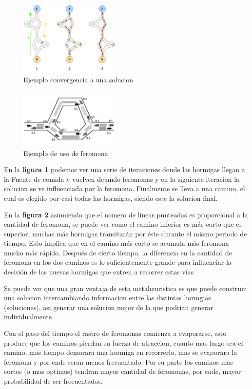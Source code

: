 \begin{figure}[h]
\centering
\caption{Ejemplo convergencia a una solucion}
\includegraphics[width=5cm]{imagenes/feromona}
\end{figure}

\begin{figure}[h]
\caption{Ejemplo de uso de feromona}
\centering
\includegraphics[width=5cm]{imagenes/feromona2}
\end{figure}

En la \textbf{figura 1} podemos ver una serie de iteraciones donde las hormigas llegan a la Fuente de comida y vuelven dejando feromonas y en la siguiente iteracion la solucion se ve influenciada por la feromona. Finalmente se lleva a una camino, el cual es elegido por casi todas las hormigas, siendo este la solucion final.

En la \textbf{figura 2} asumiendo que el nomero de lineas punteadas es proporcional a la cantidad de feromona, se puede ver como el camino inferior es más corto que el superior, muchas más hormigas transitarán por éste durante el mismo periodo de tiempo. Esto implica que en el camino más corto se acumula más feromona mucho más rápido. Después de cierto tiempo, la diferencia en la cantidad de feromona en los dos caminos es lo suficientemente grande para influenciar la decisión de las nuevas hormigas que entren a recorrer estas vías

Se puede ver que una gran ventaja de esta metaheuristica es que puede construir una solucion intercambiando informacion entre las distintas hormgias (soluciones), asi generar una solucion mejor de la que podrian generar individualmente.

Con el paso del tiempo el rastro de feromonas comienza a evaporarse, esto produce que los caminos pierdan su fuerza de atraccion, cuanto mas largo sea el camino, mas tiempo demorara una hormiga en recorrerlo, mas se evaporara la feromona y por ende seran menos frecuentado. Por su parte los caminos mas cortos (o mas optimos) tendran mayor cantidad de feromonas, por ende, mayor probabilidad de ser frecuentados.


